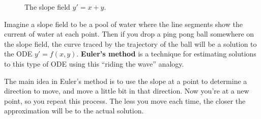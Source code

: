 \begin{figure}[H]
\centering
{}
\caption{The slope field $y'=x+y$.}
\end{figure}


Imagine a slope field to be a pool of water where the line segments show the current of water at each point. Then if you drop a ping pong ball somewhere on the slope field, the curve traced by the trajectory of the ball will be a solution to the ODE $y'=f(x,y)$. \textbf{Euler's method} is a technique for estimating solutions to this type of ODE using this ``riding the wave'' analogy.


The main idea in Euler's method is to use the slope at a point to determine a direction to move, and move a little bit in that direction. Now you're at a new point, so you repeat this process. The less you move each time, the closer the approximation will be to the actual solution.

